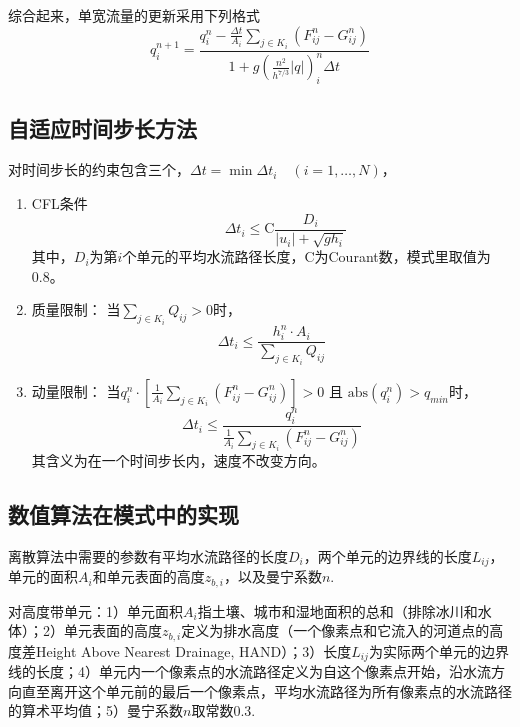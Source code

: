 综合起来，单宽流量的更新采用下列格式
\begin{equation}
q^{n+1}_i = \frac{q^n_i - \frac{\Delta t}{A_i}\sum_{j\in K_i} \left(F^n_{ij} - G^n_{ij}\right)}{1 + g \left(\frac{n^2}{h^{7/3}} \left|q\right|\right)^n_i \Delta t}
\end{equation}

\subsection{自适应时间步长方法}
对时间步长的约束包含三个，$\Delta t = \min \Delta t_i \quad (i=1, \ldots, N)$，
\begin{enumerate}
\item CFL条件
\begin{equation}
\qquad \Delta t_i \leq \mathrm{C}\frac{ D_i }{\left| u_{i}\right| + \sqrt{gh_{i}}}
\end{equation}
其中，$D_i$为第$i$个单元的平均水流路径长度，C为Courant数，模式里取值为0.8。
\item 质量限制：
当$\sum_{j\in K_i} Q_{ij}>0$时，
  \begin{equation}
 \Delta t_i \leq \frac{h^n_i\cdot A_i}{\sum_{j\in K_i} Q_{ij}}
 \end{equation}
\item 动量限制：
当$q^n_i \cdot \left[ \frac{1}{A_i}\sum_{j\in K_i} \left(F^n_{ij} - G^n_{ij} \right)\right] > 0$ 且 $\mathrm{abs}\left(q^n_i\right) > q_{min}$时，
  \begin{equation}
 \Delta t_i \leq \frac{q^n_i}{\frac{1}{A_i}\sum_{j\in K_i} \left(F^n_{ij} - G^n_{ij} \right)}
 \end{equation}
其含义为在一个时间步长内，速度不改变方向。
 \end{enumerate}

\subsection{数值算法在模式中的实现}

离散算法中需要的参数有平均水流路径的长度$D_i$，两个单元的边界线的长度$L_{ij}$，单元的面积$A_i$和单元表面的高度$z_{b,i}$，以及曼宁系数$n$.

对高度带单元：1）单元面积$A_i$指土壤、城市和湿地面积的总和（排除冰川和水体）；2）单元表面的高度$z_{b,i}$定义为排水高度（一个像素点和它流入的河道点的高度差Height Above Nearest Drainage, HAND）；3）长度$L_{ij}$为实际两个单元的边界线的长度；4）单元内一个像素点的水流路径定义为自这个像素点开始，沿水流方向直至离开这个单元前的最后一个像素点，平均水流路径为所有像素点的水流路径的算术平均值；5）曼宁系数$n$取常数$0.3$.

